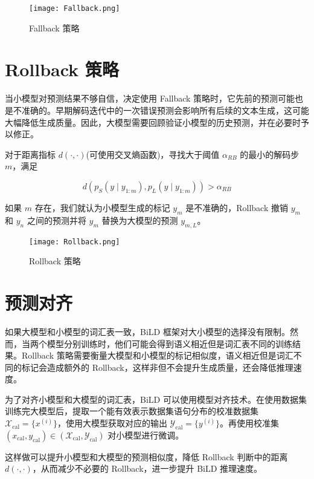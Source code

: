 \begin{figure}[htbp]
    \centering
    \texttt{[image: Fallback.png]}
    \caption{Fallback 策略}
    \label{fig:Fallback}
\end{figure}

\section{Rollback 策略}

当小模型对预测结果不够自信，决定使用 Fallback 策略时，它先前的预测可能也是不准确的。早期解码迭代中的一次错误预测会影响所有后续的文本生成，这可能大幅降低生成质量。因此，大模型需要回顾验证小模型的历史预测，并在必要时予以修正。

对于距离指标 $d(\cdot,\cdot)$(可使用交叉熵函数)，寻找大于阈值 $\alpha_{RB}$ 的最小的解码步 $m$，满足

\begin{equation}
    d\left(p_S\left(y \mid y_{1: m}\right), p_L\left(y \mid y_{1: m}\right)\right)>\alpha_{R B}
\end{equation}

如果 $m$ 存在，我们就认为小模型生成的标记 $y_m$ 是不准确的，Rollback 撤销 $y_{m}$ 和 $y_{n}$ 之间的预测并将 $y_m$ 替换为大模型的预测 $y_{m,L}$。

\begin{figure}[htbp]
    \centering
    \texttt{[image: Rollback.png]}
    \caption{Rollback 策略}
    \label{fig:Rollback}
\end{figure}

\section{预测对齐}

如果大模型和小模型的词汇表一致，BiLD 框架对大小模型的选择没有限制。然而，当两个模型分别训练时，他们可能会得到语义相近但是词汇表不同的训练结果。Rollback 策略需要衡量大模型和小模型的标记相似度，语义相近但是词汇不同的标记会造成额外的 Rollback，这样非但不会提升生成质量，还会降低推理速度。

为了对齐小模型和大模型的词汇表，BiLD 可以使用模型对齐技术。在使用数据集训练完大模型后，提取一个能有效表示数据集语句分布的校准数据集 $\mathcal{X}_{\mathrm{cal}}=\{x^{(i)}\}$，使用大模型获取对应的输出 $\mathcal{Y}_{\mathrm{cal}}=\{y^{(i)}\}$。再使用校准集 $\left(x_{\mathrm{cal}}, y_{\mathrm{cal}}\right) \in\left(\mathcal{X}_{\mathrm{cal}}, \mathcal{Y}_{\mathrm{cal}}\right)$ 对小模型进行微调。

这样做可以提升小模型和大模型的预测相似度，降低 Rollback 判断中的距离 $d(\cdot,\cdot)$，从而减少不必要的 Rollback，进一步提升 BiLD 推理速度。
